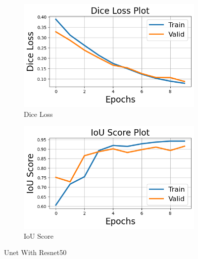 \documentclass[12pt]{article}
\begin{document}
\begin{figure}[H]
  \begin{subfigure}[b]{0.5\textwidth}
    \includegraphics[width=\textwidth]{Figs/unetwithresnetdice.png}
    \caption{Dice Loss}
    \label{fig:f1}
  \end{subfigure}
  \hfill
  \begin{subfigure}[b]{0.5\textwidth}
    \includegraphics[width=\textwidth]{Figs/unetwithresnetiou.png}
    \caption{IoU Score}
    \label{fig:f2}
  \end{subfigure}
  \caption{Unet With Resnet50}
\end{figure}
\end{document}

